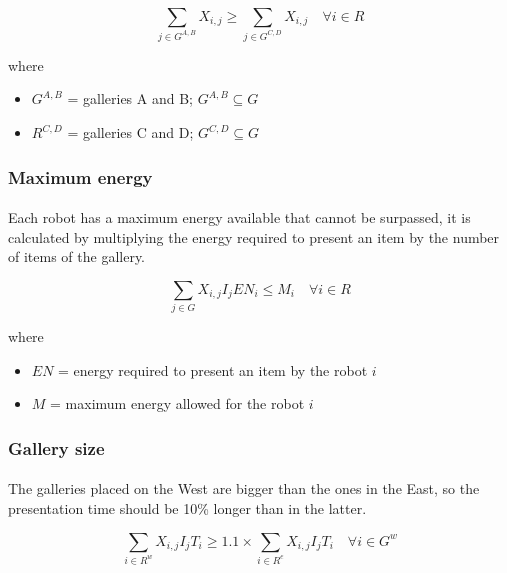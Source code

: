 \begin{equation}
    \sum_{j \in G^{A,B}} X_{i,j} \geq \sum_{j \in G^{C,D}} X_{i,j} \quad \forall i \in R
\end{equation}

where

\begin{itemize}
    \item[] $G^{A,B}$ = galleries A and B; $G^{A,B} \subseteq G$
    \item[] $R^{C,D}$ = galleries C and D; $G^{C,D} \subseteq G$
\end{itemize}



\subsubsection{Maximum energy}

\paragraph{}
Each robot has a maximum energy available that cannot be surpassed, it is calculated by multiplying the energy required to present an item by the number of items of the gallery. 

\begin{equation}
    \sum_{j \in G} X_{i,j} I_j EN_i \leq M_i \quad \forall i \in R
\end{equation}

where

\begin{itemize}
    \item[] $EN$ = energy required to present an item by the robot $i$
    \item[] $M$ = maximum energy allowed for the robot $i$
\end{itemize}




\subsubsection{Gallery size}

\paragraph{}
The galleries placed on the West are bigger than the ones in the East, so the presentation time should be 10\% longer than in the latter.

\begin{equation}
    \sum_{i \in R^w} {X_{i,j} I_j T_i} \geq 1.1 \times \sum_{i \in R^e} {X_{i,j} I_j T_i} \quad \forall i \in G^w
\end{equation}



